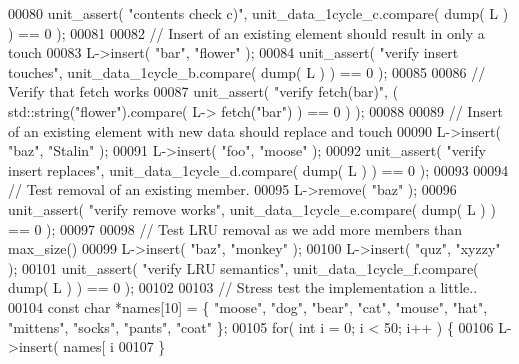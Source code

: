 \begin{DoxyCode}
00080         unit_assert( \textcolor{stringliteral}{"contents check c)"}, unit\_data\_1cycle\_c.compare( dump( L ) )
       == 0 );
00081 
00082         \textcolor{comment}{// Insert of an existing element should result in only a touch}
00083         L->insert( \textcolor{stringliteral}{"bar"}, \textcolor{stringliteral}{"flower"} );
00084         unit_assert( \textcolor{stringliteral}{"verify insert touches"}, unit\_data\_1cycle\_b.compare( dump( L
       ) ) == 0 );
00085 
00086         \textcolor{comment}{// Verify that fetch works}
00087         unit_assert( \textcolor{stringliteral}{"verify fetch(bar)"}, ( std::string(\textcolor{stringliteral}{"flower"}).compare( L->
      fetch(\textcolor{stringliteral}{"bar"}) ) == 0 ) );
00088 
00089         \textcolor{comment}{// Insert of an existing element with new data should replace and touch}
00090         L->insert( \textcolor{stringliteral}{"baz"}, \textcolor{stringliteral}{"Stalin"} );
00091         L->insert( \textcolor{stringliteral}{"foo"}, \textcolor{stringliteral}{"moose"} );
00092         unit_assert( \textcolor{stringliteral}{"verify insert replaces"}, unit\_data\_1cycle\_d.compare( dump( 
      L ) ) == 0 );
00093 
00094         \textcolor{comment}{// Test removal of an existing member.}
00095         L->remove( \textcolor{stringliteral}{"baz"} );
00096         unit_assert( \textcolor{stringliteral}{"verify remove works"}, unit\_data\_1cycle\_e.compare( dump( L )
       ) == 0 );
00097 
00098         \textcolor{comment}{// Test LRU removal as we add more members than max\_size()}
00099         L->insert( \textcolor{stringliteral}{"baz"}, \textcolor{stringliteral}{"monkey"} );
00100         L->insert( \textcolor{stringliteral}{"quz"}, \textcolor{stringliteral}{"xyzzy"} );
00101         unit_assert( \textcolor{stringliteral}{"verify LRU semantics"}, unit\_data\_1cycle\_f.compare( dump( L 
      ) ) == 0 );
00102 
00103         \textcolor{comment}{// Stress test the implementation a little..}
00104         \textcolor{keyword}{const} \textcolor{keywordtype}{char} *names[10] = \{ \textcolor{stringliteral}{"moose"}, \textcolor{stringliteral}{"dog"}, \textcolor{stringliteral}{"bear"}, \textcolor{stringliteral}{"cat"}, \textcolor{stringliteral}{"mouse"}, \textcolor{stringliteral}{"hat"}, 
      \textcolor{stringliteral}{"mittens"}, \textcolor{stringliteral}{"socks"}, \textcolor{stringliteral}{"pants"}, \textcolor{stringliteral}{"coat"} \};
00105         \textcolor{keywordflow}{for}( \textcolor{keywordtype}{int} i = 0; i < 50; i++ ) \{
00106                 L->insert( names[ i %
00107         \}

\end{DoxyCode}
